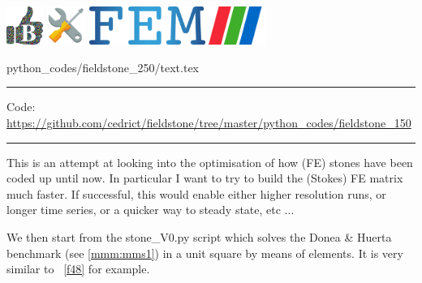 \noindent
\includegraphics[height=1.25cm]{images/pictograms/benchmark}
\includegraphics[height=1.25cm]{images/pictograms/tools}
\includegraphics[height=1.25cm]{images/pictograms/FEM}
\includegraphics[height=1.25cm]{images/pictograms/paraview}



\begin{flushright} {\tiny {\color{gray} python\_codes/fieldstone\_250/text.tex}} \end{flushright}



\par\noindent\rule{\textwidth}{0.4pt}

\begin{center}
\inpython
{\small Code: \url{https://github.com/cedrict/fieldstone/tree/master/python_codes/fieldstone_150}}
\end{center}

\par\noindent\rule{\textwidth}{0.4pt}


This \stone is an attempt at looking into the optimisation of how (FE) stones have been coded 
up until now. In particular I want to try to build the (Stokes) FE matrix much faster.
If successful, this would enable either higher resolution runs, or longer time series, 
or a quicker way to steady state, etc ...

We then start from the {\pythonfile stone\_V0.py} script which solves the 
Donea \& Huerta benchmark (see \ref{mmm:mms1}) in a unit square by means of \QtwoQone elements.
It is very similar to \stone~\ref{f48} for example.

